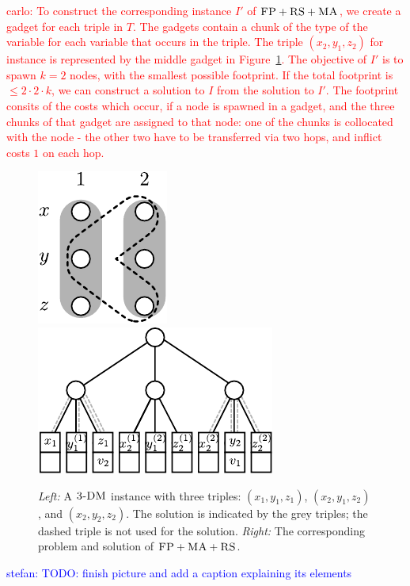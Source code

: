 \documentclass[9pt]{sigcomm-alternate}
\newcommand{\carlo}[1]{\textcolor{red}{carlo: #1}}
\newcommand{\stefan}[1]{\textcolor{blue}{stefan: #1}}
\newcommand{\FP}{\textsc{FP}}
\newcommand{\RS}{\textsc{RS}}
\newcommand{\MA}{\textsc{MA}}
\newcommand{\TDM}{\textsc{3-DM}}
\begin{document}
\carlo{To construct the corresponding instance $I'$ of $\FP+\RS+\MA$, we 
create a gadget for each triple in $T$. The gadgets contain a chunk of the 
type of the variable for each variable that occurs in the triple. The triple 
$(x_2, y_1, z_2)$ for instance is represented by the middle gadget in 
Figure~\ref{fig:fprsma}. The objective of $I'$ is to spawn $k=2$ nodes, 
with the smallest possible footprint. If the total footprint is $\leq 
2\cdot2\cdot k$, we can construct a solution to $I$ from the solution to $I'$. 
The footprint consits of the costs which occur, if a node is spawned in a 
gadget, and the three chunks of that gadget are assigned to that node: one of 
the chunks is collocated with the node - the other two have to be transferred 
via two hops, and inflict costs $1$ on each hop.}
\begin{figure}[t]
\includegraphics[width = 0.3\columnwidth]{figs/np_3dm_formular}
\hfill
\includegraphics[width = 0.6\columnwidth]{figs/np_3dm_construction}
\caption{\textit{Left:} A $\TDM$ instance with three triples:
$(x_1, y_1, z_1)$, $(x_2, y_1, z_2)$, and $(x_2, y_2, z_2)$. The solution is
indicated by the grey triples; the dashed triple is not used for the
solution. \textit{Right:} The corresponding problem and solution of $\FP + \MA
+ \RS$.}
\label{fig:fprsma}
\end{figure}
\stefan{TODO: finish picture and add a caption explaining its
elements}
\end{document}
